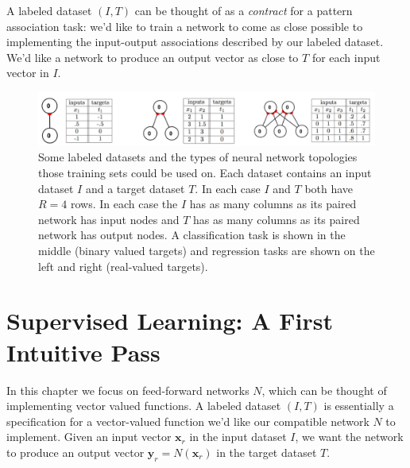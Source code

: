 A labeled dataset $(I,T)$ can be thought of as a \emph{contract} for a pattern association task: we'd like to train a network to come as close possible to implementing the input-output associations described by our labeled dataset. We'd like a network to produce an output vector as close to $T$ for each  input vector in $I$.

\begin{figure}[h]
\centering
\includegraphics[scale=.4]{./images/TablesAndNets.png}
\caption[Jeff Yoshimi.]{Some labeled datasets and the types of neural network topologies those training sets could be used on. Each dataset contains an input dataset $I$ and a target dataset $T$. In each case $I$ and $T$ both have $R=4$ rows. In each case the $I$ has as many columns as its paired network has input nodes and $T$ has as many columns as its paired network has output nodes. A classification task is shown in the middle (binary valued targets) and regression tasks are shown on the left and right (real-valued targets).}
\label{tables_nets}
\end{figure}

\section{Supervised Learning: A First Intuitive Pass}\label{SupervisedFirstPass}

 In this chapter we focus on feed-forward networks $N$, which can be thought of implementing vector valued functions. A labeled dataset $(I,T)$ is essentially a specification for a vector-valued function we'd like our compatible network $N$ to implement. Given an input vector $\mathbf{x}_r$ in the input dataset $I$, we want the network to produce an output vector $\mathbf{y}_r = N(\mathbf{x}_r)$ in the target dataset $T$. 


